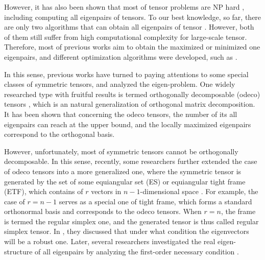 \documentclass{elsarticle}
\begin{document}

However,  it  has  also  been   shown  that  most of tensor  problems  are NP hard  \cite{NP-hard},  including computing all  eigenpairs of tensors.
To our best knowledge,  
so far,  there are  only  two  algorithms that  can  obtain  all  eigenpairs of tensor \cite{Cuicf,hm}.
However, 
both of them  still  suffer from high   computational  complexity for large-scale tensor. 
Therefore, most of  previous works aim
 to obtain the maximized or minimized one eigenpairs, and different optimization algorithms were developed, such as \cite{SHOPM,ASHOPM,NCM}.


In  this sense, previous works have 
turned to  paying  attentions to some   special  classes  of  symmetric  tensors,  
and analyzed the  eigen-problem. 
One   widely researched   type   with fruitful results 
is termed 
  orthogonally  decomposable  (odeco) tensors \cite{odst,OTD,Hsu,sr1,cunmu,GloballyConvergent},  
  which 
  is  
  an natural generalization of orthogonal matrix decomposition.
It has been shown that
concerning the odeco tensors, 
the number of 
its 
all  eigenpairs can reach at the upper bound\cite{odst},
and the locally maximized eigenpairs correspond to the 
orthogonal basis. 



  
  

However, 
unfortunately, 
most of symmetric tensors cannot be 
orthogonally  decomposable. 
In  this sense, 
recently, 
some researchers further  extended 
the case of  odeco tensors into 
a  more generalized one, where the  symmetric  tensor  is  generated  by 
the set of some  equiangular  set (ES) or equiangular tight frame (ETF), which contains 
 of $r$ vectors in 
$n-1$-dimensional space \cite{RobustEigen}. 
For  example, 
the case of  $r=n-1$  serves as a  special one of tight frame,  which  
forms a  standard orthonormal  basis and  corresponds to 
the  odeco tensors.
When $r=n$,  the 
frame is termed the regular simplex one, 
and the  generated tensor is thus called regular simplex tensor. 
In  \cite{RobustEigen}, 
they  discussed that under what  condition 
the eigenvectors will be a robust one.
Later, 
several researchers 
investigated 
the real eigen-structure 
of  all eigenpairs
by  analyzing the first-order 
necessary condition \cite{teneigenstructure}.
\end{document}
